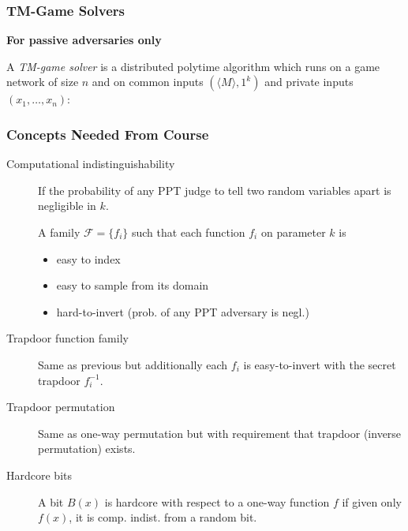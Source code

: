 \documentclass[10pt]{beamer}
\begin{document}
\begin{frame}
\frametitle{TM-Game Solvers}

\begin{frame}

\textbf{For passive adversaries only}

A \textit{TM-game solver} is a distributed polytime algorithm which runs
on a game network of size $n$ and on common inputs
$(\langle M \rangle, 1^k)$ and private inputs $(x_1,\ldots,x_n)$:


\end{frame}

\begin{frame}
\frametitle{Concepts Needed From Course}

\begin{description}

\item[Computational indistinguishability]
If the probability of any PPT judge to tell two random variables apart is
negligible in $k$.

\item[
\item[One-way function family]
A family $\mathcal{F} = \{f_i\}$ such that each function $f_i$ on
parameter $k$ is
\begin{itemize}
\item easy to index
\item easy to sample from its domain
\item hard-to-invert (prob. of any PPT adversary is negl.)
\end{itemize}

\item[Trapdoor function family]
Same as previous but additionally each $f_i$ is easy-to-invert with
the secret trapdoor $f_i^{-1}$.

\item[Trapdoor permutation]
Same as one-way permutation but with requirement that trapdoor
(inverse permutation) exists.

\item[Hardcore bits]
A bit $B(x)$ is hardcore with respect to a one-way function $f$ if
given only $f(x)$, it is comp. indist. from a random bit.

\end{description}

\end{frame}


\end{frame}
\end{document}
